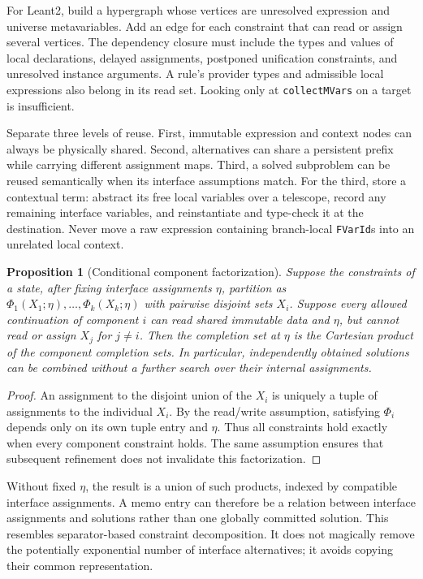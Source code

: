 \documentclass[11pt,a4paper]{article}
\newtheorem{proposition}[theorem]{Proposition}
\theoremstyle{definition}
\theoremstyle{remark}
\newcommand{\code}[1]{\texttt{#1}}
\begin{document}
For Leant2, build a hypergraph whose vertices are unresolved expression and
universe metavariables. Add an edge for each constraint that can read or assign
several vertices. The dependency closure must include the types and values of
local declarations, delayed assignments, postponed unification constraints,
and unresolved instance arguments. A rule's provider types and admissible
local expressions also belong in its read set. Looking only at
\code{collectMVars} on a target is insufficient.

Separate three levels of reuse. First, immutable expression and context nodes
can always be physically shared. Second, alternatives can share a persistent
prefix while carrying different assignment maps. Third, a solved subproblem
can be reused semantically when its interface assumptions match. For the third,
store a contextual term: abstract its free local variables over a telescope,
record any remaining interface variables, and reinstantiate and type-check it
at the destination. Never move a raw expression containing branch-local
\code{FVarId}s into an unrelated local context.

\begin{proposition}[Conditional component factorization]
Suppose the constraints of a state, after fixing interface assignments $\eta$,
partition as $\Phi_1(X_1;\eta),\ldots,\Phi_k(X_k;\eta)$ with pairwise disjoint
sets $X_i$. Suppose every allowed continuation of component $i$ can read shared
immutable data and $\eta$, but cannot read or assign $X_j$ for $j\ne i$.
Then the completion set at $\eta$ is the Cartesian product of the component
completion sets. In particular, independently obtained solutions can be
combined without a further search over their internal assignments.
\end{proposition}
\begin{proof}
An assignment to the disjoint union of the $X_i$ is uniquely a tuple of
assignments to the individual $X_i$. By the read/write assumption, satisfying
$\Phi_i$ depends only on its own tuple entry and $\eta$. Thus all constraints
hold exactly when every component constraint holds. The same assumption
ensures that subsequent refinement does not invalidate this factorization.
\end{proof}

Without fixed $\eta$, the result is a union of such products, indexed by
compatible interface assignments. A memo entry can therefore be a relation
between interface assignments and solutions rather than one globally committed
solution. This resembles separator-based constraint decomposition. It does not
magically remove the potentially exponential number of interface alternatives;
it avoids copying their common representation.
\end{document}
